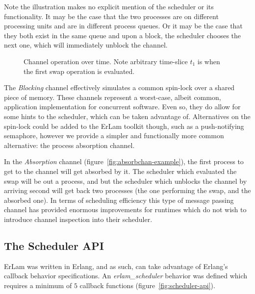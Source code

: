 Note the illustration makes no explicit mention of the scheduler or its 
functionality. It may be the case that the two processes are on different 
processing units and are in different process queues. 
Or it may be the case that they both exist in the
same queue and upon a block, the scheduler chooses the next one, which will 
immediately unblock the channel.

\begin{figure}
\centering 
{}
\caption{Channel operation over time. Note arbitrary time-slice $t_1$ is when the 
first swap operation is evaluated.}
\end{figure}

The {\sl Blocking} channel effectively simulates a common spin-lock over a shared 
piece of memory. These channels represent a worst-case, albeit common, application 
implementation for concurrent software. Even so, they do allow for some hints
to the scheduler, which can be taken advantage of. Alternatives on the spin-lock 
could be added to the ErLam toolkit though, such as a push-notifying semaphore, 
however we provide a simpler and functionally more common alternative: the process 
absorption channel.

In the {\sl Absorption} channel (figure~\ref{fig:absorbchan-example}), the first 
process to get to the channel will get absorbed by it. The scheduler which 
evaluated the swap will be out a process, and but the scheduler which unblocks the channel 
by arriving second will get back two processes (the one performing the swap, 
and the absorbed one). In terms of scheduling efficiency this type of message
passing channel has provided enormous improvements for runtimes which do not
wish to introduce channel inspection into their scheduler.

\subsection{The Scheduler API}\label{sec:the scheduler api}

ErLam was written in Erlang, and as such, can take advantage of Erlang's 
callback behavior specifications. An \emph{erlam\_scheduler} behavior was
defined which requires a minimum of $5$ callback functions 
(figure~\ref{fig:scheduler-api}).

